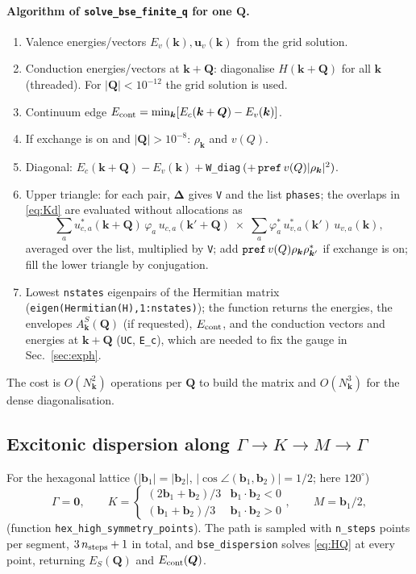 \documentclass[11pt,a4paper]{article}
\newcommand{\kk}{\bm{k}}
\newcommand{\QQ}{\bm{Q}}
\newcommand{\bb}{\bm{b}}
\newcommand{\code}[1]{\texttt{#1}}
\newcommand{\Nk}{N_{\bm k}}
\begin{document}
\paragraph{Algorithm of \code{solve\_bse\_finite\_q} for one $\QQ$.}
\begin{enumerate}[leftmargin=*,itemsep=0pt]
\item Valence energies/vectors $E_v(\kk),\bm u_v(\kk)$ from the grid solution.
\item Conduction energies/vectors at $\kk+\QQ$: diagonalise $H(\kk+\QQ)$ for all $\kk$ (threaded). For $|\QQ|<10^{-12}$ the grid solution is used.
\item Continuum edge $E_{\rm cont}=\min_{\kk}[E_c(\kk+\QQ)-E_v(\kk)]$.
\item If exchange is on and $|\QQ|>10^{-8}$: $\rho_{\kk}$ and $v(Q)$.
\item Diagonal: $E_c(\kk+\QQ)-E_v(\kk)+$\code{W\_diag}$\,(+\,\text{\code{pref}}\,v(Q)|\rho_{\kk}|^2)$.
\item Upper triangle: for each pair, $\bm\Delta$ gives \code{V} and the list \code{phases}; the overlaps in \eqref{eq:Kd} are evaluated without allocations as
\[
\sum_a u^*_{c,a}(\kk{+}\QQ)\,\varphi_a\,u_{c,a}(\kk'{+}\QQ)\;\times\;\sum_a\varphi^*_a\,u^*_{v,a}(\kk')\,u_{v,a}(\kk),
\]
averaged over the list, multiplied by \code{V}; add $\text{\code{pref}}\,v(Q)\rho_{\kk}\rho^*_{\kk'}$ if exchange is on; fill the lower triangle by conjugation.
\item Lowest \code{nstates} eigenpairs of the Hermitian matrix (\code{eigen(Hermitian(H),1:nstates)}); the function returns the energies, the envelopes $A^S_{\kk}(\QQ)$ (if requested), $E_{\rm cont}$, and the conduction vectors and energies at $\kk+\QQ$ (\code{UC}, \code{E\_c}), which are needed to fix the gauge in Sec.~\ref{sec:exph}.
\end{enumerate}
The cost is $O(\Nk^2)$ operations per $\QQ$ to build the matrix and $O(\Nk^3)$ for the dense diagonalisation.

\subsection{Excitonic dispersion along $\Gamma\to K\to M\to\Gamma$}
For the hexagonal lattice ($|\bb_1|=|\bb_2|$, $|\cos\angle(\bb_1,\bb_2)|=1/2$; here $120^\circ$)
\begin{equation}
\Gamma=\bm0,\qquad K=\begin{cases}(2\bb_1+\bb_2)/3&\bb_1\cdot\bb_2<0\\(\bb_1+\bb_2)/3&\bb_1\cdot\bb_2>0\end{cases},\qquad M=\bb_1/2,
\end{equation}
(function \code{hex\_high\_symmetry\_points}). The path is sampled with \code{n\_steps} points per segment, $3\,n_{\rm steps}+1$ in total, and \code{bse\_dispersion} solves \eqref{eq:HQ} at every point, returning $E_S(\QQ)$ and $E_{\rm cont}(\QQ)$.
\end{document}
